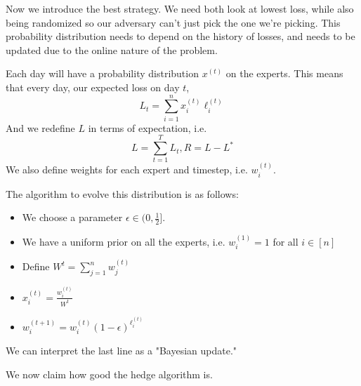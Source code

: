 Now we introduce the best strategy. We need both look at lowest loss, while also being randomized
so our adversary can't just pick the one we're picking. This probability distribution needs to depend on the history of losses,
and needs to be updated due to the online nature of the problem.

\begin{algothm}
    Each day will have a probability distribution $x^{(t)}$ on the experts. This means that every day, our expected loss on day $t$,
    \[ L_t = \sum_{i = 1}^n x_i^{(t)} \ell_i^{(t)} \]
    And we redefine $L$ in terms of expectation, i.e.
    \[ L = \sum_{t = 1}^T L_t, R = L - L^* \]
    We also define weights for each expert and timestep, i.e. $w_i^{(t)}$.
    
    The algorithm to evolve this distribution is as follows:
    \begin{itemize}
        \item We choose a parameter $\epsilon \in (0, \frac{1}{2}]$.
        \item We have a uniform prior on all the experts, i.e. $w_i^{(1)} = 1$  for all $i \in [n]$
        \item Define $W^{t} = \sum_{j = 1}^n w_j^{(t)}$
        \item $x_i^{(t)} = \frac{w_i^{(t)}}{W^{t}}$
        \item $w_i^{(t + 1)} = w_i^{(t)} (1 - \epsilon)^{\ell_i^{(t)}}$
    \end{itemize}

    We can interpret the last line as a "Bayesian update."
\end{algothm}

We now claim how good the hedge algorithm is.

